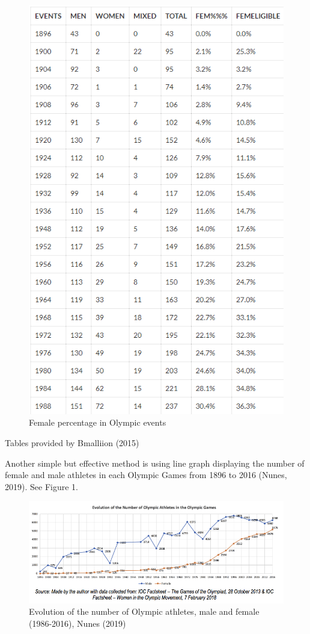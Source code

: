 \documentclass[12pt]{article}
\begin{document}
\begin{table}[!hb]
\begin{subfigure}[t]{2.5in}
    \includegraphics[scale=0.3]{pics/1-2.png}
    \caption{Female percentage in Olympic events}\label{fig:1b}
  \end{subfigure}
  \caption{Tables provided by Bmalliion (2015)}\label{fig:1}
\end{table}

Another simple but effective method is using line graph displaying the number of female and male athletes in each Olympic Games from 1896 to 2016 (Nunes, 2019). See Figure 1. 

\begin{figure}
    \centering
    \includegraphics[trim={0 3.5cm 0 0},clip, scale=0.7]{pics/1-3.png}
    \caption{Evolution of the number of Olympic athletes, male and female (1986-2016), Nunes (2019)}
    \label{fig:my_label}
\end{figure}
\end{document}
